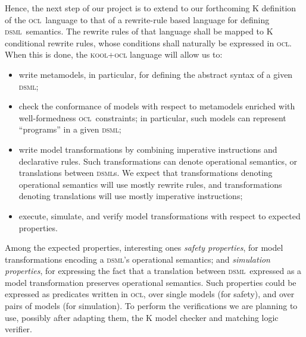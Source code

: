 \documentclass[a4paper,11pt,twoside]{article}
\newcommand{\dsml}{\textsc{dsml}}
\newcommand{\dsmls}{\textsc{dsml}s}
\newcommand{\ocl}{\textsc{ocl}}
\begin{document}
Hence, the next step of our project is to extend to our forthcoming K definition of the \ocl\ language to that of a rewrite-rule based language for defining \dsml\ semantics. The rewrite
rules of that language shall be  mapped to K conditional rewrite rules, whose conditions shall naturally be expressed in \ocl. When this is done, the  \textsc{kool+ocl}  language will 
allow us to:
\begin{itemize}
\item write metamodels, in particular, for defining the abstract syntax of a given \dsml;
\item check the conformance of models with respect to  metamodels enriched with well-formedness \ocl\ constraints; in particular, such models can represent ``programs'' in a given \dsml;
\item write model transformations by combining imperative instructions and declarative rules. Such transformations can denote operational semantics, 
or translations between   \dsmls. We expect that  transformations denoting operational semantics will use mostly rewrite rules, and  transformations denoting translations will use mostly imperative instructions;
\item execute, simulate, and verify model transformations with respect to expected properties.
\end{itemize}
Among the expected properties, interesting ones \emph{safety properties}, for model transformations encoding a \dsml's operational semantics; and \emph{simulation properties}, for expressing the fact that a translation between \dsml\ expressed as a model transformation 
preserves operational semantics. Such properties could be expressed as predicates written in \ocl, over single models (for safety), and over pairs of models (for simulation). To perform the verifications we are planning to use, possibly after adapting them, the K model checker and matching logic verifier.


\end{document}
